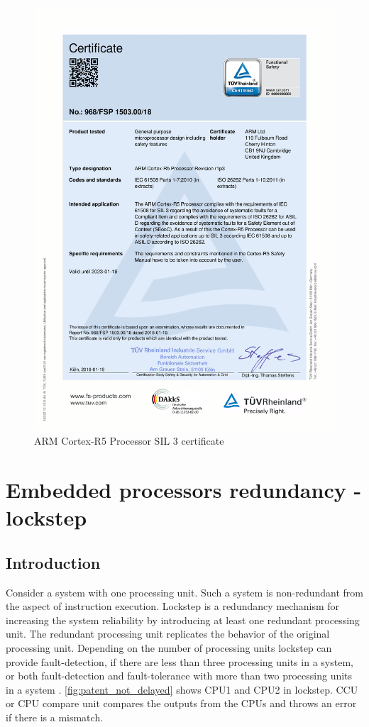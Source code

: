\begin{figure}[H]

      \centering
      \includegraphics[width=0.9\linewidth]{images/cortex_r_certificate.pdf}
      \caption{ARM Cortex-R5 Processor  SIL 3 certificate \citep{func_safety_certificate}}
      \label{fig:func_safety_certificate}
    
\end{figure}

\section{Embedded processors redundancy - lockstep}

\subsection{Introduction}

Consider a system with one processing unit. Such a system is non-redundant from the
aspect of instruction execution. Lockstep is a redundancy mechanism for increasing the system reliability
by introducing at least one redundant processing unit. The redundant processing unit replicates the behavior of
the original processing unit. Depending on the number of processing units lockstep can provide fault-detection, if there are less than three processing units in a system, or both fault-detection and
fault-tolerance with more than two processing units in a system \citep{ipavic_lockstep}. \autoref{fig:patent_not_delayed} shows CPU1 and CPU2 in lockstep. CCU or CPU compare unit compares the outputs from the CPUs and throws an error if there is a mismatch.

